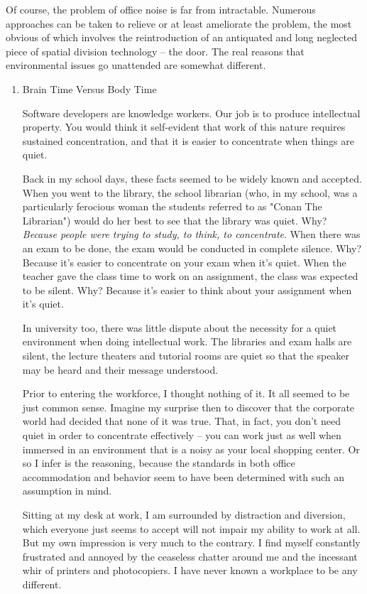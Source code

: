 \documentclass{article}
\begin{document}
Of course, the problem of office noise is far from intractable. Numerous
approaches can be taken to relieve or at least ameliorate the problem,
the most obvious of which involves the reintroduction of an antiquated
and long neglected piece of spatial division technology -- the door. The
real reasons that environmental issues go unattended are somewhat
different.

\begin{enumerate}
\item Brain Time Versus Body Time
\label{sec:orgheadline52}

Software developers are knowledge workers. Our job is to produce
intellectual property. You would think it self-evident that work of this
nature requires sustained concentration, and that it is easier to
concentrate when things are quiet.

Back in my school days, these facts seemed to be widely known and
accepted. When you went to the library, the school librarian (who, in my
school, was a particularly ferocious woman the students referred to as
"Conan The Librarian") would do her best to see that the library was
quiet. Why? \emph{Because people were trying to study, to think, to
concentrate}. When there was an exam to be done, the exam would be
conducted in complete silence. Why? Because it's easier to concentrate
on your exam when it's quiet. When the teacher gave the class time to
work on an assignment, the class was expected to be silent. Why? Because
it's easier to think about your assignment when it's quiet.

In university too, there was little dispute about the necessity for a
quiet environment when doing intellectual work. The libraries and exam
halls are silent, the lecture theaters and tutorial rooms are quiet so
that the speaker may be heard and their message understood.

Prior to entering the workforce, I thought nothing of it. It all seemed
to be just common sense. Imagine my surprise then to discover that the
corporate world had decided that none of it was true. That, in fact, you
don't need quiet in order to concentrate effectively -- you can work
just as well when immersed in an environment that is a noisy as your
local shopping center. Or so I infer is the reasoning, because the
standards in both office accommodation and behavior seem to have been
determined with such an assumption in mind.

Sitting at my desk at work, I am surrounded by distraction and
diversion, which everyone just seems to accept will not impair my
ability to work at all. But my own impression is very much to the
contrary. I find myself constantly frustrated and annoyed by the
ceaseless chatter around me and the incessant whir of printers and
photocopiers. I have never known a workplace to be any different.


\end{enumerate}
\end{document}
